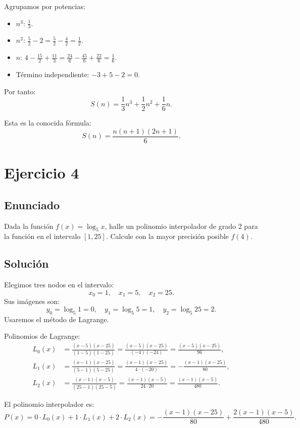 \documentclass[12pt]{article}
\begin{document}
	Agrupamos por potencias:
	\begin{itemize}
		\item \( n^3 \): \( \frac{1}{3} \).
		\item \( n^2 \): \( \frac{5}{2} - 2 = \frac{5}{2} - \frac{4}{2} = \frac{1}{2} \).
		\item \( n \): \( 4 - \frac{15}{2} + \frac{11}{3} = \frac{24}{6} - \frac{45}{6} + \frac{22}{6} = \frac{1}{6} \).
		\item Término independiente: \( -3 + 5 - 2 = 0 \).
	\end{itemize}
	
	Por tanto:
	\[
	S(n) = \frac{1}{3}n^3 + \frac{1}{2}n^2 + \frac{1}{6}n.
	\]
	
	Esta es la conocida fórmula:
	\[
	\boxed{S(n) = \frac{n(n+1)(2n+1)}{6}}.
	\]
	
	\section{Ejercicio 4}
	
	\subsection{Enunciado}
	Dada la función \( f(x) = \log_5 x \), halle un polinomio interpolador de grado 2 para la función en el intervalo \([1, 25]\). Calcule con la mayor precisión posible \( f(4) \).
	
	\subsection{Solución}
	Elegimos tres nodos en el intervalo:
	\[
	x_0 = 1,\quad x_1 = 5,\quad x_2 = 25.
	\]
	Sus imágenes son:
	\[
	y_0 = \log_5 1 = 0,\quad y_1 = \log_5 5 = 1,\quad y_2 = \log_5 25 = 2.
	\]
	Usaremos el método de Lagrange.
	
	Polinomios de Lagrange:
	\[
	\begin{aligned}
		L_0(x) &= \frac{(x-5)(x-25)}{(1-5)(1-25)} = \frac{(x-5)(x-25)}{(-4)(-24)} = \frac{(x-5)(x-25)}{96}, \\
		L_1(x) &= \frac{(x-1)(x-25)}{(5-1)(5-25)} = \frac{(x-1)(x-25)}{4 \cdot (-20)} = -\frac{(x-1)(x-25)}{80}, \\
		L_2(x) &= \frac{(x-1)(x-5)}{(25-1)(25-5)} = \frac{(x-1)(x-5)}{24 \cdot 20} = \frac{(x-1)(x-5)}{480}.
	\end{aligned}
	\]
	
	El polinomio interpolador es:
	\[
	P(x) = 0 \cdot L_0(x) + 1 \cdot L_1(x) + 2 \cdot L_2(x) = -\frac{(x-1)(x-25)}{80} + \frac{2(x-1)(x-5)}{480}.
	\]
	
\end{document}
